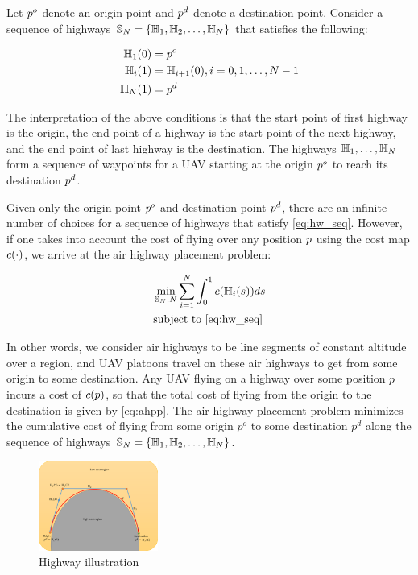 Let $p^o$ denote an origin point and $p^d$ denote a destination point. Consider a sequence of highways $\mathbb{S}_N = \{\mathbb{H}_1, \mathbb{H}_2, \ldots, \mathbb{H}_N\}$ that satisfies the following:

\begin{equation}
\label{eq:hw_seq}
\begin{aligned}
\mathbb{H}_1(0) &= p^o \\
\mathbb{H}_i(1) &= \mathbb{H}_{i+1}(0), i = 0, 1, \ldots, N-1 \\
\mathbb{H}_N(1) &= p^d \\
\end{aligned}
\end{equation}

The interpretation of the above conditions is that the start point of first highway is the origin, the end point of a highway is the start point of the next highway, and the end point of last highway is the destination. The highways $\mathbb{H}_1,\ldots,\mathbb{H}_N$ form a sequence of waypoints for a UAV starting at the origin $p^o$ to reach its destination $p^d$.

Given only the origin point $p^o$ and destination point $p^d$, there are an infinite number of choices for a sequence of highways that satisfy \eqref{eq:hw_seq}. However, if one takes into account the cost of flying over any position $p$ using the cost map $c(\cdot)$, we arrive at the air highway placement problem:

\begin{equation}
\label{eq:ahpp} %
\begin{aligned}
& \min_{\hws_N, N} \sum_{i=1}^N \int_0^1 \cmap(\hw_i(s)) ds \\
& \text{subject to \eqref{eq:hw_seq}} 
\end{aligned}
\end{equation}

In other words, we consider air highways to be line segments of constant altitude over a region, and UAV platoons travel on these air highways to get from some origin to some destination. Any UAV flying on a highway over some position $p$ incurs a cost of $c(p)$, so that the total cost of flying from the origin to the destination is given by \eqref{eq:ahpp}. The air highway placement problem minimizes the cumulative cost of flying from some origin $p^o$ to some destination $p^d$ along the sequence of highways $\mathbb{S}_N=\{\mathbb{H}_1, \mathbb{H}_2, \ldots, \mathbb{H}_N\}$.

\begin{figure}
	\centering
	\includegraphics[width=0.35\textwidth]{"fig/highway_illustration"}
	\caption{Highway illustration}
	\label{fig:hw_ill}
\end{figure}